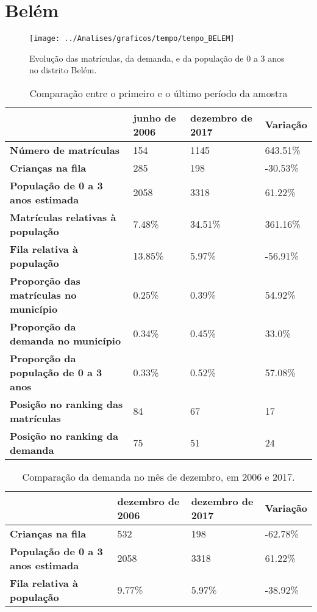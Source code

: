\section{Belém}
\begin{figure}[H]
\centering
\texttt{[image: ../Analises/graficos/tempo/tempo\_BELEM]}
\caption{Evolução das matrículas, da demanda, e da população de 0 a 3 anos no distrito Belém.}
\end{figure}
\begin{table}[H]
\begin{tabular}{|l|l|l|l|}
\hline
\textbf{}                                      & \textbf{junho de 2006}       & \textbf{dezembro de 2017}    & \textbf{Variação} \\ \hline
\textbf{Número de matrículas}                  & 154 & 1145 & 643.51\% \\ \hline
\textbf{Crianças na fila}                      & 285 & 198 & -30.53\% \\ \hline
\textbf{População de 0 a 3 anos estimada}      & 2058 & 3318 & 61.22\% \\ \hline
\textbf{Matrículas relativas à população}      & 7.48\% & 34.51\% & 361.16\% \\ \hline
\textbf{Fila relativa à população}             & 13.85\% & 5.97\% & -56.91\% \\ \hline
\textbf{Proporção das matrículas no município} & 0.25\% & 0.39\% & 54.92\% \\ \hline
\textbf{Proporção da demanda no município}     & 0.34\% & 0.45\% & 33.0\% \\ \hline
\textbf{Proporção da população de 0 a 3 anos}  & 0.33\% & 0.52\% & 57.08\% \\ \hline
\textbf{Posição no ranking das matrículas}     & 84 & 67 & 17 \\ \hline
\textbf{Posição no ranking da demanda}         & 75 & 51 & 24 \\ \hline
\end{tabular}
\caption{Comparação entre o primeiro e o último período da amostra}
\end{table}
\begin{table}[H]
\begin{tabular}{|l|l|l|l|}
\hline
\textbf{}                                 & \textbf{dezembro de 2006} & \textbf{dezembro de 2017} & \textbf{Variação} \\ \hline
\textbf{Crianças na fila}                      & 532 & 198 & -62.78\% \\ \hline
\textbf{População de 0 a 3 anos estimada}      & 2058 & 3318 & 61.22\% \\ \hline
\textbf{Fila relativa à população}             & 9.77\% & 5.97\% & -38.92\% \\ \hline
\end{tabular}
\caption{Comparação da demanda no mês de dezembro, em 2006 e 2017.}
\end{table}
